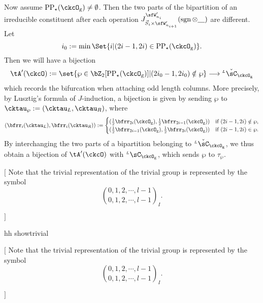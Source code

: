 \documentclass[12pt]{amsart}
\newcommand{\trivial}[2][]{\if\relax\detokenize{#1}\relax
  {%
      \color{orange} \vspace{0em}$[$#2$]$
      \color{black}
  }
  \else
\ifx#1h
\ifcsname showtrivial\endcsname
{%
    \color{orange}\vspace{0em}$[$#2$]$
    \color{black}
}
\fi
\else {\red Wrong argument!} \fi
\fi
}
\newcommand{\sgn}{\operatorname{sgn}}
\numberwithin{equation}{section}
\theoremstyle{remark}
\def\half{{\tfrac{1}{2}}}
\def\LC{{}^{\scriptscriptstyle L}\sC}
\def\ckLC{{}^{\scriptscriptstyle L}\check{\sC}}
\def\ckLC{{}^{\scriptscriptstyle L}\check\sC}
\def\CPPs{\mathrm{PP}_{\star}}
\begin{document}
{    Now assume $\CPPs(\ckcO_{\mathrm g})\neq \emptyset$. Then the two parts of the
    bipartition of an irreducible constituent after each operation
    $J_{\vec{S}_{i}\times \sfW'_{n_{i+1}}}^{\sfW'_{n_{i}}}(\sgn \otimes \underline{\ \ \ })$ are different. Let
    \[i_{0}:= \min\Set{i| (2i-1,2i)\in \CPPs(\ckcO_{\mathrm g})}.\]
    Then we will have a bijection
    \[
      \tA'(\ckcO):= \set{\wp\in \bZ_{2}[\CPPs(\ckcO_{\mathrm g})]|(2i_{0}-1,2i_{0})\notin \wp} \longrightarrow \ckLC_{\ckcO_{\mathrm g}}
    \]
    which records the bifurcation when attaching odd length columns. More precisely, by Lusztig's formula of $J$-induction, a bijection is given by sending
      $\wp$ to $\cktau_{\wp}:= (\cktau_{L},\cktau_{R})$, where
    \[
      (\bfrr_{i}(\cktau_{L}),\bfrr_{i}(\cktau_{R})) := \begin{cases} (\half\bfrr_{2i}(\ckcO_{\mathrm g}),\half\bfrr_{2i-1}(\ckcO_{\mathrm g}))
        & \text{if } (2i-1,2i)\notin \wp ,\\
        (\half\bfrr_{2i-1}(\ckcO_{\mathrm g}),\half\bfrr_{2i}(\ckcO_{\mathrm g}))
        & \text{if } (2i-1,2i)\in \wp .\\
      \end{cases}
    \]
    By interchanging the two parts of a bipartition belonging to $\ckLC_{\ckcO_{\mathrm g}}$, we thus obtain a bijection of $\tA'(\ckcO)$ with $\LC_{\ckcO_{\mathrm g}}$, which sends $\wp$ to $\tau_{\wp}$.


    \trivial[h]{ Note that the trivial representation of the trivial group is
      represented by the symbol
      \[
        \binom{0,1, 2, \cdots, l-1}{0,1,2, \cdots, l-1}_{I}.
      \]

}}
\end{document}
